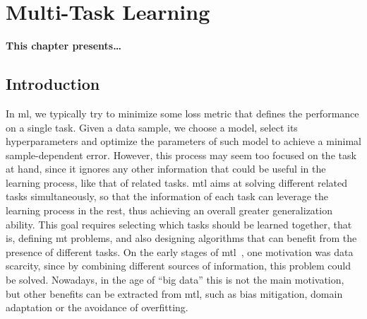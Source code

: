 
\chapter{Multi-Task Learning} %
\label{Chapter3}

\glsresetall
{} %

{\bf \small{
This chapter presents\dots
}}

\section{Introduction}



In \acrfull{ml}, we typically try to minimize some loss metric that defines the performance on a single task. Given a data sample, we choose a model, select its hyperparameters and optimize the parameters of such model to achieve a minimal sample-dependent error. However, this process may seem too focused on the task at hand, since it ignores any other information that could be useful in the learning process, like that of related tasks. 
\acrfull{mtl} aims at solving different related tasks simultaneously, so that the information of each task can leverage the learning process in the rest, thus achieving an overall greater generalization ability.
This goal requires selecting which tasks should be learned together, that is, defining \acrfull{mt} problems, and also designing algorithms that can benefit from the presence of different tasks.
On the early stages of \acrshort{mtl}~\citep{Caruana97,baxter2000model}, one motivation was data scarcity, since by combining different sources of information, this problem could be solved. Nowadays, in the age of ``big data'' this is not the main motivation, but other benefits can be extracted from \acrshort{mtl}, such as bias mitigation, domain adaptation or the avoidance of overfitting. 

